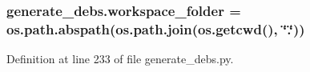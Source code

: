 \subsubsection[{\texorpdfstring{workspace\+\_\+folder}{workspace_folder}}]{\setlength{\rightskip}{0pt plus 5cm}generate\+\_\+debs.\+workspace\+\_\+folder = os.\+path.\+abspath(os.\+path.\+join(os.\+getcwd(), \char`\"{}.\char`\"{}))}\hypertarget{namespacegenerate__debs_acb69863b90257249a30e43ebacfb8bd8}{}\label{namespacegenerate__debs_acb69863b90257249a30e43ebacfb8bd8}


Definition at line 233 of file generate\+\_\+debs.\+py.

